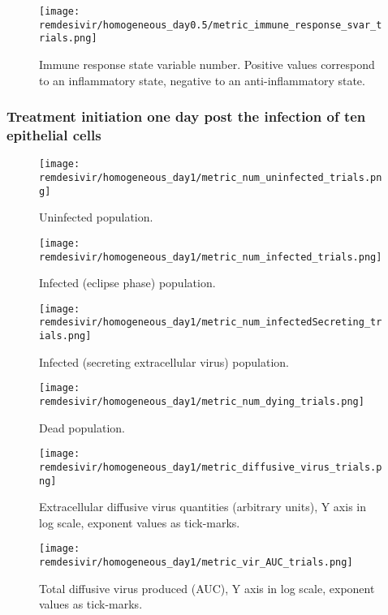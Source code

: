 \begin{figure}[H]
\texttt{[image: remdesivir/homogeneous\_day0.5/metric\_immune\_response\_svar\_trials.png]}
\caption{Immune response state variable number. Positive values correspond to an inflammatory state, negative to an anti-inflammatory state.\label{fig:app:homo_regular:day0.5:immune_var}}
\end{figure}


\subsubsection{Treatment initiation one day post the infection of ten epithelial cells}\label{sup:sec:extra_figures:homo_regular:day1}

\begin{figure}[H]
\texttt{[image: remdesivir/homogeneous\_day1/metric\_num\_uninfected\_trials.png]}
\caption{Uninfected population.\label{fig:app:homo_regular:day1:uninf}}
\end{figure}

\begin{figure}[H]
\texttt{[image: remdesivir/homogeneous\_day1/metric\_num\_infected\_trials.png]}
\caption{Infected (eclipse phase) population.\label{fig:app:homo_regular:day1:inf}}
\end{figure}

\begin{figure}[H]
\texttt{[image: remdesivir/homogeneous\_day1/metric\_num\_infectedSecreting\_trials.png]}
\caption{Infected (secreting extracellular virus) population.\label{fig:app:homo_regular:day1:infSecr}}
\end{figure}

\begin{figure}[H]
\texttt{[image: remdesivir/homogeneous\_day1/metric\_num\_dying\_trials.png]}
\caption{Dead population.\label{fig:app:homo_regular:day1:dead}}
\end{figure}

\begin{figure}[H]
\texttt{[image: remdesivir/homogeneous\_day1/metric\_diffusive\_virus\_trials.png]}
\caption{Extracellular diffusive virus quantities (arbitrary units), Y axis in log scale, exponent values as tick-marks.\label{fig:app:homo_regular:day1:diff_vir}}
\end{figure}


\begin{figure}[H]
\texttt{[image: remdesivir/homogeneous\_day1/metric\_vir\_AUC\_trials.png]}
\caption{Total diffusive virus produced (AUC), Y axis in log scale, exponent values as tick-marks.\label{fig:app:homo_regular:day1:auc_vir}}
\end{figure}

